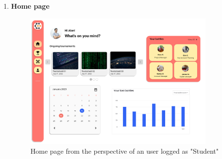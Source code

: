 \begin{enumerate}[label=\textbf{F\arabic*)}]
    \item \textbf{Home page}\\
    \begin{figure}[H]
        \centering
        \includegraphics[width=0.9\textwidth]{Mockups/3_student_homepage.png}
        \caption{Home page from the perspective of an user logged as "Student"}
    \end{figure}


\end{enumerate}

